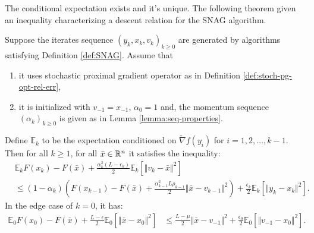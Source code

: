 \documentclass[12pt]{article}
\newcommand{\expect}{\ensuremath{\mathbb E}}
\begin{document}
        \begin{remark}
        \end{remark}
        The conditional expectation exists and it's unique. 
        The following theorem given an inequality characterizing a descent relation for the SNAG algorithm. 
        \begin{theorem}\label{thm:snag-descent}
            Suppose the iterates sequence $(y_k, x_k, v_k)_{k\ge 0}$ are generated by algorithms satisfying Definition \ref{def:SNAG}. 
            Assume that
            \begin{enumerate}[nosep]
                \item it uses stochastic proximal gradient operator as in Definition \ref{def:stoch-pg-opt-rel-err}, 
                \item it is initialized with $v_{-1} = x_{-1}$, $\alpha_0 = 1$ and, the momentum sequence $(\alpha_k)_{k \ge 0}$ is given as in Lemma \ref{lemma:seq-properties}. 
            \end{enumerate}
            Define $\expect_{k}$ to be the expectation conditioned on $\tilde \nabla f(y_i)$ for $i = 1, 2, \ldots, k - 1$. 
            Then for all $k \ge 1$, for all $\bar x \in \mathbb R^n$ it satisfies the inequality: 
            \begin{align*}
                & \expect_kF(x_k) - F(\bar x) 
                + \frac{\alpha_k^2(L - \epsilon_k)}{2}\expect_k \left[\Vert v_k - \bar x\Vert^2\right]
                \\
                &\le 
                (1 - \alpha_k)\left(
                    F(x_{k - 1}) - F(\bar x)
                    + \frac{\alpha_{k - 1}^2L\rho_{k - 1}}{2}\Vert \bar x - v_{k - 1}\Vert^2
                \right) 
                + \frac{\epsilon_k}{2}\expect_k \left[\Vert y_k - x_k \Vert^2\right].  
            \end{align*}
            In the edge case of $k = 0$, it has: 
            \begin{align*}
                \expect_0 F(x_0) - F(\bar x)  
                + \frac{L - \epsilon}{2}\expect_0\left[\Vert \bar x - x_0\Vert^2\right]
                &\le 
                \frac{L - \mu}{2} \Vert \bar x - v_{-1}\Vert^2
                + \frac{\epsilon_0}{2}\expect_0\left[\Vert v_{-1} - x_0\Vert^2\right]. 
            \end{align*}
        \end{theorem}
\end{document}

